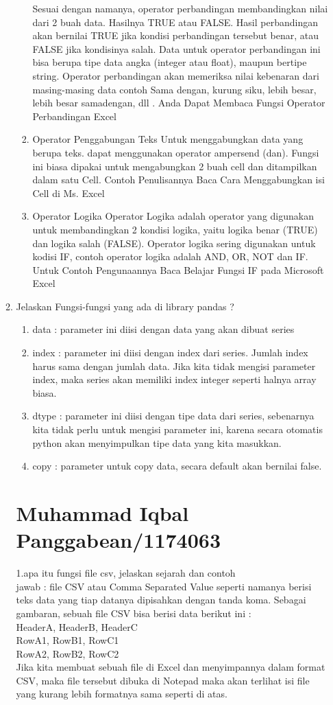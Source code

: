 \begin{enumerate}
\begin{enumerate}
\begin{enumerate}
Sesuai dengan namanya, operator perbandingan membandingkan nilai dari 2 buah data. Hasilnya TRUE atau FALSE. Hasil perbandingan akan bernilai TRUE jika kondisi perbandingan tersebut benar, atau FALSE jika kondisinya salah. Data untuk operator perbandingan ini bisa berupa tipe data angka (integer atau float), maupun bertipe string. Operator perbandingan akan memeriksa nilai kebenaran dari masing-masing data contoh Sama dengan, kurung siku, lebih besar, lebih besar samadengan,  dll . Anda Dapat Membaca Fungsi Operator Perbandingan Excel
\item Operator Penggabungan Teks
Untuk menggabungkan data yang berupa teks. dapat menggunakan operator ampersend (dan). Fungsi ini biasa dipakai untuk mengabungkan 2 buah cell dan ditampilkan dalam satu Cell. Contoh Penulisannya Baca Cara Menggabungkan isi Cell di Ms. Excel
\item Operator Logika
Operator Logika adalah operator yang digunakan untuk membandingkan 2 kondisi logika, yaitu logika benar (TRUE) dan logika salah (FALSE). Operator logika sering digunakan untuk kodisi IF, contoh operator logika adalah  AND, OR, NOT dan IF. Untuk Contoh Pengunaannya Baca Belajar Fungsi IF pada Microsoft Excel
\end{enumerate}
\item Jelaskan Fungsi-fungsi yang ada di library pandas ?
\begin{enumerate}
\item data : parameter ini diisi dengan data yang akan dibuat series
\item index : parameter ini diisi dengan index dari series. Jumlah index harus sama dengan jumlah data. Jika kita tidak mengisi parameter index, maka series akan memiliki index integer seperti halnya array biasa.
\item dtype : parameter ini diisi dengan tipe data dari series, sebenarnya kita tidak perlu untuk mengisi parameter ini, karena secara otomatis python akan menyimpulkan tipe data yang kita masukkan.
\item copy : parameter untuk copy data, secara default akan bernilai false.

\end{enumerate}

\section{Muhammad Iqbal Panggabean/1174063}
1.apa itu fungsi file csv, jelaskan sejarah dan contoh\\
jawab : file CSV atau Comma Separated Value seperti namanya berisi teks data yang tiap datanya dipisahkan dengan tanda koma. Sebagai gambaran, sebuah file CSV bisa berisi data berikut ini :\\
HeaderA, HeaderB, HeaderC\\
RowA1, RowB1, RowC1\\
RowA2, RowB2, RowC2\\
Jika kita membuat sebuah file di Excel dan menyimpannya dalam format CSV, maka file tersebut dibuka di Notepad maka akan terlihat isi file yang kurang lebih formatnya sama seperti di atas.\\


\end{enumerate}
\end{enumerate}
